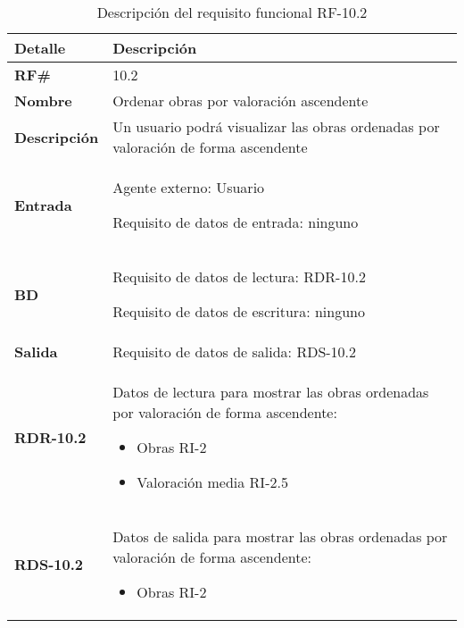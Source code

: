 \begin{table}[H]
    \centering
    \begin{tabular}{|p{3cm}|p{8cm}|}
        \hline
        \rowcolor{lightgray}
        \textbf{Detalle} & \textbf{Descripción} \\
        \hline
        \textbf{RF\#} & 10.2 \\
        \hline
        \textbf{Nombre} & Ordenar obras por valoración ascendente \\
        \hline
        \textbf{Descripción} & Un usuario podrá visualizar las obras ordenadas
        por valoración de forma ascendente \\
        \hline
        \textbf{Entrada} &
        Agente externo: Usuario
        
        Requisito de datos de entrada: ninguno \\
        \hline
        \textbf{BD} &
        Requisito de datos de lectura: RDR-10.2
        
        Requisito de datos de escritura: ninguno \\
        \hline
        \textbf{Salida} & Requisito de datos de salida: RDS-10.2 \\
        \hline
        \textbf{RDR-10.2} & Datos de lectura para mostrar las obras ordenadas por valoración
        de forma ascendente:
            \begin{itemize}
                \item Obras RI-2
                \item Valoración media RI-2.5
            \end{itemize} \\
        \hline
        \textbf{RDS-10.2} & Datos de salida para mostrar las obras ordenadas por valoración
        de forma ascendente:
            \begin{itemize}
                \item Obras RI-2
            \end{itemize} \\
        \hline
    \end{tabular}
    \caption{Descripción del requisito funcional RF-10.2}
    \label{tab:rf-10-2}
\end{table}

